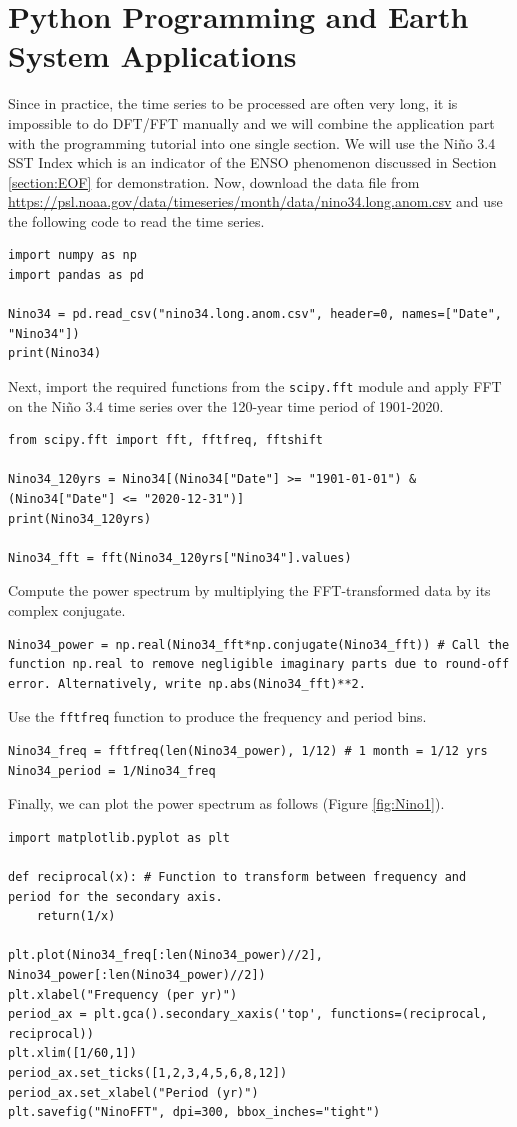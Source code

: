 \section{Python Programming and Earth System Applications}

Since in practice, the time series to be processed are often very long, it is impossible to do DFT/FFT manually and we will combine the application part with the programming tutorial into one single section. We will use the Niño 3.4 SST Index which is an indicator of the ENSO phenomenon discussed in Section \ref{section:EOF} for demonstration. Now, download the data file from \href{https://psl.noaa.gov/data/timeseries/month/data/nino34.long.anom.csv}{https://psl.noaa.gov/data/timeseries/month/data/nino34.long.anom.csv} and use the following code to read the time series.
\begin{lstlisting}
import numpy as np
import pandas as pd

Nino34 = pd.read_csv("nino34.long.anom.csv", header=0, names=["Date", "Nino34"])
print(Nino34)
\end{lstlisting}
Next, import the required functions from the \verb|scipy.fft| module and apply FFT on the Niño 3.4 time series over the 120-year time period of 1901-2020.
\begin{lstlisting}
from scipy.fft import fft, fftfreq, fftshift

Nino34_120yrs = Nino34[(Nino34["Date"] >= "1901-01-01") & (Nino34["Date"] <= "2020-12-31")]
print(Nino34_120yrs)

Nino34_fft = fft(Nino34_120yrs["Nino34"].values) 
\end{lstlisting}
Compute the power spectrum by multiplying the FFT-transformed data by its complex conjugate.
\begin{lstlisting}
Nino34_power = np.real(Nino34_fft*np.conjugate(Nino34_fft)) # Call the function np.real to remove negligible imaginary parts due to round-off error. Alternatively, write np.abs(Nino34_fft)**2.
\end{lstlisting}
Use the \verb|fftfreq| function to produce the frequency and period bins.
\begin{lstlisting}
Nino34_freq = fftfreq(len(Nino34_power), 1/12) # 1 month = 1/12 yrs
Nino34_period = 1/Nino34_freq
\end{lstlisting}
Finally, we can plot the power spectrum as follows (Figure \ref{fig:Nino1}).
\begin{lstlisting}
import matplotlib.pyplot as plt

def reciprocal(x): # Function to transform between frequency and period for the secondary axis.
    return(1/x)

plt.plot(Nino34_freq[:len(Nino34_power)//2], Nino34_power[:len(Nino34_power)//2])
plt.xlabel("Frequency (per yr)")
period_ax = plt.gca().secondary_xaxis('top', functions=(reciprocal, reciprocal))
plt.xlim([1/60,1])
period_ax.set_ticks([1,2,3,4,5,6,8,12])
period_ax.set_xlabel("Period (yr)")
plt.savefig("NinoFFT", dpi=300, bbox_inches="tight")
\end{lstlisting}
